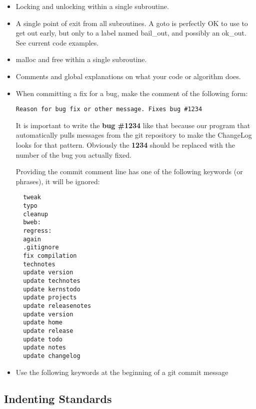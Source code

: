 \begin{itemize}
\item Locking and unlocking within a single subroutine.  

\item A single point of exit from all subroutines. A goto is 
     perfectly OK to use to get out early, but only to a label
     named bail\_out, and possibly an ok\_out.  See current code
     examples.

\item malloc and free within a single subroutine.  

\item Comments and global explanations on what your code or  algorithm does. 

\item When committing a fix for a bug, make the comment of the
following form:

\begin{verbatim}
Reason for bug fix or other message. Fixes bug #1234 
\end{verbatim}

It is important to write the {\bf bug \#1234} like
that because our program that automatically pulls messages
from the git repository to make the ChangeLog looks for that
pattern.  Obviously the {\bf 1234} should be replaced with
the number of the bug you actually fixed.

Providing the commit comment line has one of the following
keywords (or phrases), it will be ignored:

\begin{verbatim}
  tweak
  typo
  cleanup
  bweb:
  regress:
  again
  .gitignore
  fix compilation
  technotes
  update version
  update technotes
  update kernstodo
  update projects
  update releasenotes
  update version
  update home
  update release
  update todo
  update notes
  update changelog
\end{verbatim}

\item Use the following keywords at the beginning of
a git commit message 


\end{itemize}

\subsection{Indenting Standards}

